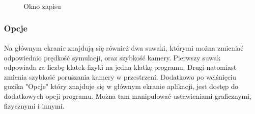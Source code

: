 \begin{figure}[ht!]
\centering
{}
\caption{Okno zapisu}
\label{fig:inst_04}
\end{figure}

\subsubsection{Opcje}\label{ssub:opcje}
\paragraph{}

Na głównym ekranie znajdują się również dwa suwaki, którymi można zmieniać odpowiednio prędkość symulacji, oraz szybkość kamery. Pierwszy suwak odpowiada za liczbę klatek fizyki na jedną klatkę programu. Drugi natomiast zmienia szybkość poruszania kamery w przestrzeni. Dodatkowo po wciśnięciu guzika "Opcje" który znajduje się w głównym ekranie aplikacji, jest dostęp do dodatkowych opcji programu. Można tam manipulować ustawieniami graficznymi, fizycznymi i innymi.

